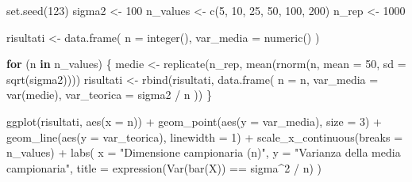\documentclass[
  italian,
  letterpaper,
  a4paper,
  11pt,
  open=any]{scrbook}
\newenvironment{Shaded}{\begin{snugshade}}{\end{snugshade}}
\newcommand{\AttributeTok}[1]{\textcolor[rgb]{0.40,0.45,0.13}{#1}}
\newcommand{\ControlFlowTok}[1]{\textcolor[rgb]{0.00,0.23,0.31}{\textbf{#1}}}
\newcommand{\DecValTok}[1]{\textcolor[rgb]{0.68,0.00,0.00}{#1}}
\newcommand{\FunctionTok}[1]{\textcolor[rgb]{0.28,0.35,0.67}{#1}}
\newcommand{\NormalTok}[1]{\textcolor[rgb]{0.00,0.23,0.31}{#1}}
\newcommand{\OtherTok}[1]{\textcolor[rgb]{0.00,0.23,0.31}{#1}}
\newcommand{\SpecialCharTok}[1]{\textcolor[rgb]{0.37,0.37,0.37}{#1}}
\newcommand{\StringTok}[1]{\textcolor[rgb]{0.13,0.47,0.30}{#1}}
\theoremstyle{plain}
\theoremstyle{definition}
\theoremstyle{definition}
\theoremstyle{remark}
\begin{document}
\begin{Shaded}
\begin{Highlighting}[]
\FunctionTok{set.seed}\NormalTok{(}\DecValTok{123}\NormalTok{)}
\NormalTok{sigma2 }\OtherTok{\textless{}{-}} \DecValTok{100}
\NormalTok{n\_values }\OtherTok{\textless{}{-}} \FunctionTok{c}\NormalTok{(}\DecValTok{5}\NormalTok{, }\DecValTok{10}\NormalTok{, }\DecValTok{25}\NormalTok{, }\DecValTok{50}\NormalTok{, }\DecValTok{100}\NormalTok{, }\DecValTok{200}\NormalTok{)}
\NormalTok{n\_rep }\OtherTok{\textless{}{-}} \DecValTok{1000}

\NormalTok{risultati }\OtherTok{\textless{}{-}} \FunctionTok{data.frame}\NormalTok{(}
  \AttributeTok{n =} \FunctionTok{integer}\NormalTok{(),}
  \AttributeTok{var\_media =} \FunctionTok{numeric}\NormalTok{()}
\NormalTok{)}

\ControlFlowTok{for}\NormalTok{ (n }\ControlFlowTok{in}\NormalTok{ n\_values) \{}
\NormalTok{  medie }\OtherTok{\textless{}{-}} \FunctionTok{replicate}\NormalTok{(n\_rep, }\FunctionTok{mean}\NormalTok{(}\FunctionTok{rnorm}\NormalTok{(n, }\AttributeTok{mean =} \DecValTok{50}\NormalTok{, }\AttributeTok{sd =} \FunctionTok{sqrt}\NormalTok{(sigma2))))}
\NormalTok{  risultati }\OtherTok{\textless{}{-}} \FunctionTok{rbind}\NormalTok{(risultati, }\FunctionTok{data.frame}\NormalTok{(}
    \AttributeTok{n =}\NormalTok{ n,}
    \AttributeTok{var\_media =} \FunctionTok{var}\NormalTok{(medie),}
    \AttributeTok{var\_teorica =}\NormalTok{ sigma2 }\SpecialCharTok{/}\NormalTok{ n}
\NormalTok{  ))}
\NormalTok{\}}

\FunctionTok{ggplot}\NormalTok{(risultati, }\FunctionTok{aes}\NormalTok{(}\AttributeTok{x =}\NormalTok{ n)) }\SpecialCharTok{+}
  \FunctionTok{geom\_point}\NormalTok{(}\FunctionTok{aes}\NormalTok{(}\AttributeTok{y =}\NormalTok{ var\_media), }\AttributeTok{size =} \DecValTok{3}\NormalTok{) }\SpecialCharTok{+}
  \FunctionTok{geom\_line}\NormalTok{(}\FunctionTok{aes}\NormalTok{(}\AttributeTok{y =}\NormalTok{ var\_teorica), }\AttributeTok{linewidth =} \DecValTok{1}\NormalTok{) }\SpecialCharTok{+}
  \FunctionTok{scale\_x\_continuous}\NormalTok{(}\AttributeTok{breaks =}\NormalTok{ n\_values) }\SpecialCharTok{+}
  \FunctionTok{labs}\NormalTok{(}
    \AttributeTok{x =} \StringTok{"Dimensione campionaria (n)"}\NormalTok{,}
    \AttributeTok{y =} \StringTok{"Varianza della media campionaria"}\NormalTok{,}
    \AttributeTok{title =} \FunctionTok{expression}\NormalTok{(}\FunctionTok{Var}\NormalTok{(}\FunctionTok{bar}\NormalTok{(X)) }\SpecialCharTok{==}\NormalTok{ sigma}\SpecialCharTok{\^{}}\DecValTok{2} \SpecialCharTok{/}\NormalTok{ n)}
\NormalTok{  )}
\end{Highlighting}
\end{Shaded}
\end{document}
